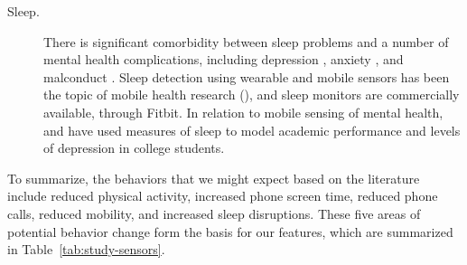 \begin{description}
\item[Sleep.] There is significant comorbidity between sleep problems and a number of mental health complications, including depression \citep{Vandeputte:2003}, anxiety \citep{Morrison:1992}, and malconduct \citep{Papadimitriou:2005}. Sleep detection using wearable and mobile sensors has been the topic of mobile health research (\eg \cite{Min:2014}), and sleep monitors are commercially available, \eg through Fitbit. In relation to mobile sensing of mental health, \citet{wang2014studentlife} and \citet{Wang:2018} have used measures of sleep to model academic performance and levels of depression in college students. 
\end{description}

\vspace{1em}
\noindent
To summarize, the behaviors that we might expect based on the literature include reduced physical activity, increased phone screen time, reduced phone calls, reduced mobility, and increased sleep disruptions. These five areas of potential behavior change form the basis for our features, which are summarized in Table~\ref{tab:study-sensors}.

